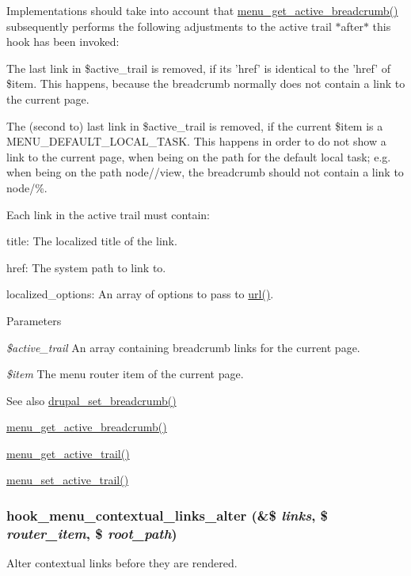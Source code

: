 Implementations should take into account that \hyperlink{group__menu_ga009731c4b3e736ebb620ba90e7f04207}{menu\_\-get\_\-active\_\-breadcrumb()} subsequently performs the following adjustments to the active trail $\ast$after$\ast$ this hook has been invoked:
\begin{DoxyItemize}
\item The last link in \$active\_\-trail is removed, if its 'href' is identical to the 'href' of \$item. This happens, because the breadcrumb normally does not contain a link to the current page.
\item The (second to) last link in \$active\_\-trail is removed, if the current \$item is a MENU\_\-DEFAULT\_\-LOCAL\_\-TASK. This happens in order to do not show a link to the current page, when being on the path for the default local task; e.g. when being on the path node//view, the breadcrumb should not contain a link to node/\%.
\end{DoxyItemize}

Each link in the active trail must contain:
\begin{DoxyItemize}
\item title: The localized title of the link.
\item href: The system path to link to.
\item localized\_\-options: An array of options to pass to \hyperlink{common_8inc_a43b2a0594431556db49df980801d8807}{url()}.
\end{DoxyItemize}


\begin{DoxyParams}{Parameters}
\item[{\em \$active\_\-trail}]An array containing breadcrumb links for the current page. \item[{\em \$item}]The menu router item of the current page.\end{DoxyParams}
\begin{DoxySeeAlso}{See also}
\hyperlink{common_8inc_a666113d06fa6ea461aff580e5c511eb0}{drupal\_\-set\_\-breadcrumb()} 

\hyperlink{group__menu_ga009731c4b3e736ebb620ba90e7f04207}{menu\_\-get\_\-active\_\-breadcrumb()} 

\hyperlink{group__menu_ga55105d602c5c5ea5b39aae25aa47f8c5}{menu\_\-get\_\-active\_\-trail()} 

\hyperlink{group__menu_ga9328a9a4f297d8bb095d924e75a8abd7}{menu\_\-set\_\-active\_\-trail()} 
\end{DoxySeeAlso}
\hypertarget{group__hooks_ga2731120f62502453acd650710f8252b9}{
\subsubsection[{hook\_\-menu\_\-contextual\_\-links\_\-alter}]{\setlength{\rightskip}{0pt plus 5cm}hook\_\-menu\_\-contextual\_\-links\_\-alter (\&\$ {\em links}, \/  \$ {\em router\_\-item}, \/  \$ {\em root\_\-path})}}
\label{group__hooks_ga2731120f62502453acd650710f8252b9}
Alter contextual links before they are rendered.

